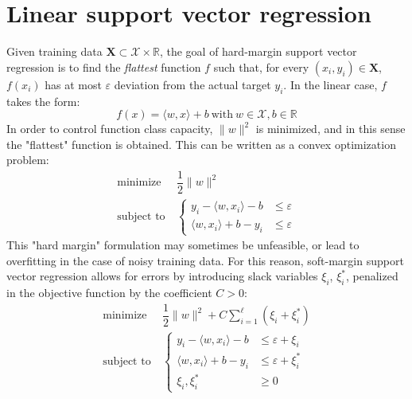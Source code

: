 \documentclass[12pt]{report}
\begin{document}
\section{Linear support vector regression}
Given training data $ \mathbf{X} \subset \mathcal{X} \times \mathbb{R} $, the goal of hard-margin support vector regression is to find the \textit{flattest} function $ f $ such that, for every $ (x_{i},y_{i}) \in \mathbf{X} $, $ f(x_{i}) $ has at most $ \varepsilon $ deviation from the actual target $ y_{i} $. In the linear case, $ f $ takes the form:
\begin{equation} \label{linfun}
f(x) = \langle w,x \rangle + b \ \text{with} \ w \in \mathcal{X}, b \in \mathbb{R}
\end{equation}
In order to control function class capacity, $ \| w \|^2 $ is minimized, and in this sense the "flattest" function is obtained. This can be written as a convex optimization problem:
\begin{equation} \label{hmargprimal}
\begin{split}
\text{minimize} &\ \dfrac{1}{2}\| w \|^2 \\
\text{subject to} &\ \begin{cases}
y_{i} - \langle w,x_{i} \rangle - b &\leq \varepsilon \\
\langle w,x_{i} \rangle + b - y_{i} &\leq \varepsilon
\end{cases}
\end{split}
\end{equation}
This "hard margin" formulation may sometimes be unfeasible, or lead to overfitting in the case of noisy training data. For this reason, soft-margin support vector regression allows for errors by introducing slack variables $ \xi_{i} $, $ \xi_{i}^{*} $, penalized in the objective function by the coefficient $ C > 0 $:
\begin{equation} \label{smargprimal}
\begin{split}
\text{minimize} &\ \dfrac{1}{2}\| w \|^2 + C\sum_{i=1}^{\ell}(\xi_{i} + \xi_{i}^{*}) \\
\text{subject to} &\ \begin{cases}
y_{i} - \langle w,x_{i} \rangle - b &\leq \varepsilon + \xi_{i} \\
\langle w,x_{i} \rangle + b - y_{i} &\leq \varepsilon + \xi_{i}^{*} \\
\xi_{i}, \xi_{i}^{*} &\geq 0
\end{cases}
\end{split}
\end{equation}
\end{document}
